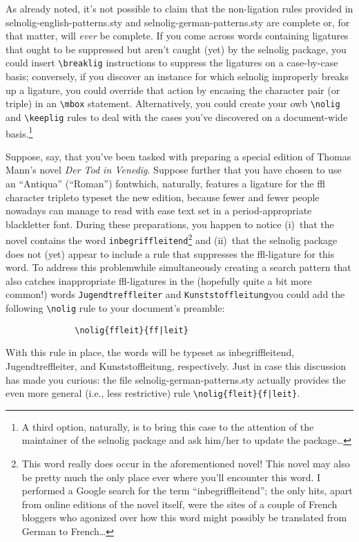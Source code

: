 \documentclass[11pt]{article}
\newcommand{\pkg}[1]{\textsf{#1}}
\newcommand{\opt}[1]{\texttt{#1}}
\newcommand{\cmmd}[1]{\texttt{\textbackslash #1}}
\begin{document}
As already noted, it's not possible to claim that the non-ligation rules provided in \pkg{selnolig-english-patterns.sty} and \pkg{selnolig-german-patterns.sty} are complete or, for that matter, will \emph{ever} be complete. If you come across words containing ligatures that ought to be suppressed but aren't caught (yet) by the \pkg{selnolig} package, you could insert \cmmd{breaklig} instructions to suppress the ligatures on a case-by-case basis; conversely, if you discover an instance for which \pkg{selnolig} improperly breaks up a ligature, you could override that action by encasing the character pair (or triple) in an \cmmd{mbox} statement. Alternatively, you could create your owb \cmmd{nolig} and \cmmd{keeplig} rules to deal with the cases you've discovered on a document-wide basis.\footnote{A third option, naturally, is to bring this case to the attention of the maintainer of the \pkg{selnolig} package and ask him/her to update the package\dots}

Suppose, say, that you've been tasked with preparing a special edition of Thomas Mann's novel \emph{Der Tod in Venedig}. Suppose further that you have chosen to use an \enquote{Antiqua} (\enquote{Roman}) font\textemdash which, naturally, features a ligature for the ffl character triple\textemdash to typeset the new edition, because fewer and fewer people nowadays can manage to read with ease text set in a {\blackletterfont period-appropriate blackletter font}. During these preparations, you happen to notice (i)~that the novel contains the word \opt{inbegriffleitend}\footnote{This word really does occur in the aforementioned novel! This novel may also be pretty much the only place ever where you'll encounter this word. I performed a Google search for the term \enquote{inbegriffleitend}; the only hits, apart from online editions of the novel itself, were the sites of a couple of French bloggers who agonized over how this word might possibly be translated from German to French\dots} and (ii)~that the \pkg{selnolig} package does not (yet) appear to include a rule that suppresses the ffl-ligature for this word. To address this problem\textemdash while simultaneously creating a search pattern that also catches inappropriate ffl-ligatures in the (hopefully quite a bit more common!) words \opt{Jugendtreffleiter} and \opt{Kunststoffleitung}\textemdash you could add the following \Verb+\nolig+ rule to your document's preamble:
\begin{Verbatim}
              \nolig{ffleit}{ff|leit}
\end{Verbatim}
With this rule in place, the words will be typeset as inbegriffleitend, Jugendtreffleiter, and Kunststoffleitung, respectively. Just in case this discussion has made you curious: the file \pkg{selnolig-german-patterns.sty} actually provides the even more general (i.e., less restrictive) rule \Verb+\nolig{fleit}{f|leit}+.
\end{document}
